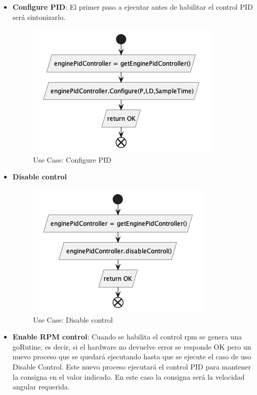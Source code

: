 \begin{itemize}
    \item \textbf{Configure PID}: El primer paso a ejecutar antes de habilitar el control PID será sintonizarlo.

    \begin{figure}[H]
        \centering
        \includegraphics[height=0.2\textheight]{./part/Proyecto_ejecutivo/memoria_descriptiva/descripcionDelProyecto/control/uml/configurePID}
        \caption{Use Case: Configure PID}\label{fig:Use Case-Configure PID}
    \end{figure}

    \item \textbf{Disable control}

    \begin{figure}[H]
        \centering
        \includegraphics[height=0.2\textheight]{./part/Proyecto_ejecutivo/memoria_descriptiva/descripcionDelProyecto/control/uml/disableControl}
        \caption{Use Case: Disable control}\label{fig:Use Case- Disable control}
    \end{figure}

    \item \textbf{Enable RPM control}: Cuando se habilita el control rpm se genera una goRutine, es decir, si el hardware no devuelve error se responde OK pero un nuevo proceso que se quedará ejecutando hasta que se ejecute el caso de uso Disable Control.
    Este nuevo proceso ejecutará el control PID para mantener la consigna en el valor indicado.
    En este caso la consigna será la velocidad angular requerida.


\end{itemize}
